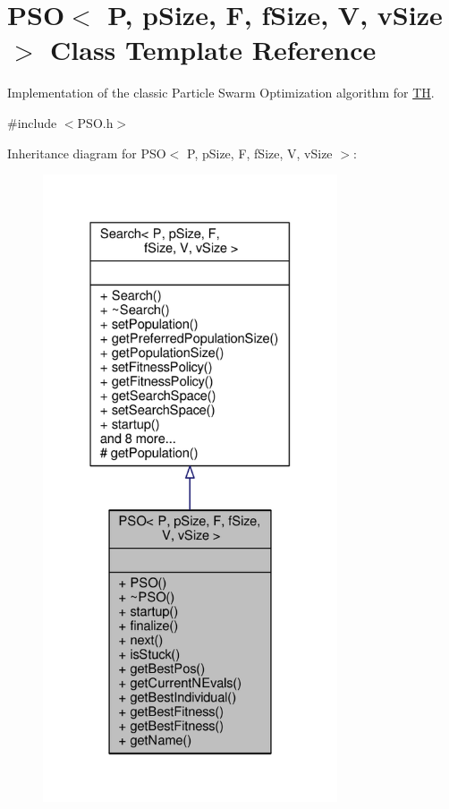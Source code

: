 \hypertarget{classPSO}{}\section{P\+SO$<$ P, p\+Size, F, f\+Size, V, v\+Size $>$ Class Template Reference}
\label{classPSO}


Implementation of the classic Particle Swarm Optimization algorithm for \hyperlink{classTH}{TH}.  




{\ttfamily \#include $<$P\+S\+O.\+h$>$}



Inheritance diagram for P\+SO$<$ P, p\+Size, F, f\+Size, V, v\+Size $>$\+:
\nopagebreak
\begin{figure}[H]
\begin{center}
\leavevmode
\includegraphics[width=247pt]{classPSO__inherit__graph}
\end{center}
\end{figure}


